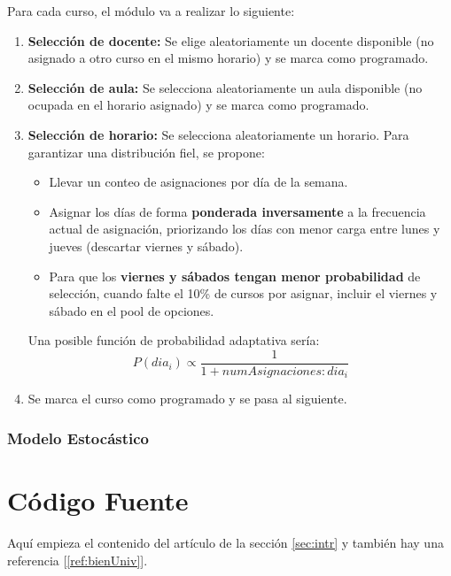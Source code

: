 \documentclass{article}
\begin{document}
Para cada curso, el módulo va a realizar lo siguiente:

\begin{enumerate}
  \item \textbf{Selección de docente:} Se elige aleatoriamente un docente disponible 
        (no asignado a otro curso en el mismo horario) y se marca como programado.
  \item \textbf{Selección de aula:} Se selecciona aleatoriamente un aula disponible 
        (no ocupada en el horario asignado) y se marca como programado.
  \item \textbf{Selección de horario:} Se selecciona aleatoriamente un horario. 
      Para garantizar una distribución fiel, se propone:

  \begin{itemize}
    \item Llevar un conteo de asignaciones por día de la semana.
    \item Asignar los días de forma \textbf{ponderada inversamente} a la frecuencia actual de 
          asignación, priorizando los días con menor carga entre lunes y jueves (descartar viernes
          y sábado).
    \item Para que los \textbf{viernes y sábados tengan menor probabilidad} de selección, cuando 
          falte el 10\% de cursos por asignar, incluir el viernes y sábado en el pool de opciones.
  \end{itemize}

  Una posible función de probabilidad adaptativa sería:
  $$
  P(dia_{i}) \propto \frac{1}{1 + numAsignaciones:dia_{i}}
  $$

  \item Se marca el curso como programado y se pasa al siguiente.
\end{enumerate}



\subsubsection{Modelo Estocástico}




\section{Código Fuente}\label{sec:cod}
Aquí empieza el contenido del artículo de la sección \ref{sec:intr} y también hay una referencia [\ref{ref:bienUniv}].
\end{document}
